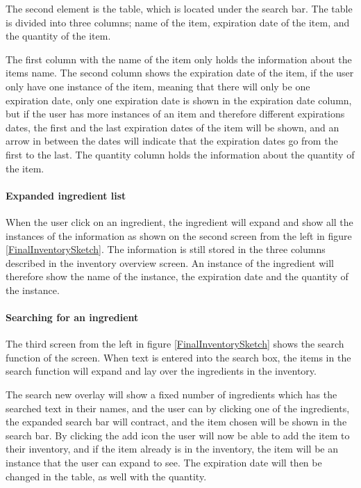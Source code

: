 The second element is the table, which is located under the search bar. The table is divided into three columns; name of the item, expiration date of the item, and the quantity of the item.

The first column with the name of the item only holds the information about the items name. The second column shows the expiration date of the item, if the user only have one instance of the item, meaning that there will only be one expiration date, only one expiration date is shown in the expiration date column, but if the user has more instances of an item and therefore different expirations dates, the first and the last expiration dates of the item will be shown, and an arrow in between the dates will indicate that the expiration dates go from the first to the last. The quantity column holds the information about the quantity of the item.

\paragraph{Expanded ingredient list}

When the user click on an ingredient, the ingredient will expand and show all the instances of the information as shown on the second screen from the left in figure \ref{FinalInventorySketch}. The information is still stored in the three columns described in the inventory overview screen. An instance of the ingredient will therefore show the name of the instance, the expiration date and the quantity of the instance. 

\paragraph{Searching for an ingredient}

The third screen from the left in figure \ref{FinalInventorySketch} shows the search function of the screen. When text is entered into the search box, the items in the search function will expand and lay over the ingredients in the inventory.

The search new overlay will show a fixed number of ingredients which has the searched text in their names, and the user can by clicking one of the ingredients, the expanded search bar will contract, and the item chosen will be shown in the search bar. By clicking the add icon the user will now be able to add the item to their inventory, and if the item already is in the inventory, the item will be an instance that the user can expand to see. The expiration date will then be changed in the table, as well with the quantity.